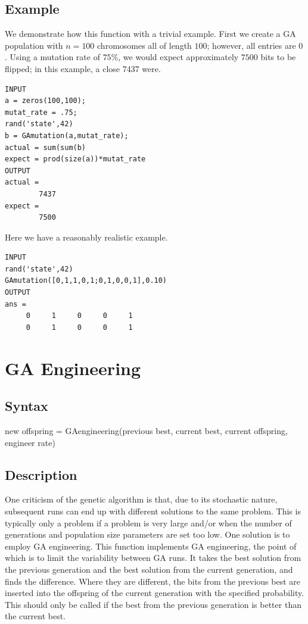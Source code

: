 \documentclass{book}
\newcommand{\textcode}[1]{\textsf{\small #1}}   %
\begin{document}
\subsection*{Example}

We demonstrate how this function with a trivial example. First we create a
GA population with $n=100$ chromosomes all of length $100$; however, all
entries are $0$. Using a mutation rate of $75\%$, we would expect
approximately $7500$ bits to be flipped; in this example, a close 7437 were.
\begin{verbatim}
INPUT
a = zeros(100,100);
mutat_rate = .75;
rand('state',42)
b = GAmutation(a,mutat_rate);
actual = sum(sum(b)
expect = prod(size(a))*mutat_rate
OUTPUT
actual =
        7437
expect =
        7500
\end{verbatim}
Here we have a reasonably realistic example.
\begin{verbatim}
INPUT
rand('state',42)
GAmutation([0,1,1,0,1;0,1,0,0,1],0.10)
OUTPUT
ans =
     0     1     0     0     1
     0     1     0     0     1
\end{verbatim}

\section{GA Engineering}

\subsection*{Syntax}

\textcode{new offspring = GAengineering(previous best, current
best, current offspring, engineer rate)}

\subsection*{Description}

One criticism of the genetic algorithm is that, due to its stochastic
nature, subsequent runs can end up with different solutions to the same
problem. This is typically only a problem if a problem is very large and/or
when the number of generations and population size parameters are set too
low. One solution is to employ GA engineering. This function implements GA
engineering, the point of which is to limit the variability between GA runs.
It takes the best solution from the previous generation and the best
solution from the current generation, and finds the difference. Where they
are different, the bits from the previous best are inserted into the
offspring of the current generation with the specified probability. This
should only be called if the best from the previous generation is better
than the current best.
\end{document}
